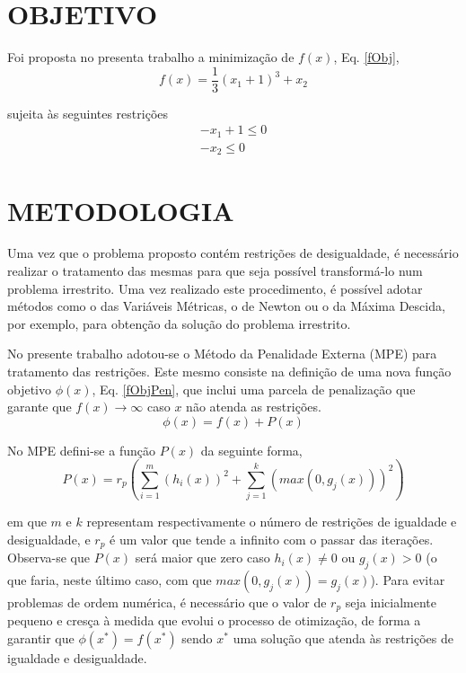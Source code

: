 \documentclass[12pt]{article}
\begin{document}
	\section{OBJETIVO}
		Foi proposta no presenta trabalho a minimização de $ f(x) $, Eq. \ref{fObj},
		\begin{equation}
			f(x) = \frac{1}{3}(x_1 + 1)^3 + x_2
			\label{fObj}
		\end{equation}
		
		sujeita às seguintes restrições
		\begin{gather}
			-x_1 + 1 \leq 0 \\
			-x_2 \leq 0
		\end{gather}
		
	\section{METODOLOGIA}
		Uma vez que o problema proposto contém restrições de desigualdade, é necessário realizar o tratamento das mesmas para que seja possível transformá-lo num problema irrestrito. Uma vez realizado este procedimento, é possível adotar métodos como o das Variáveis Métricas, o de Newton ou o da Máxima Descida, por exemplo, para obtenção da solução do problema irrestrito. 
		
		No presente trabalho adotou-se o Método da Penalidade Externa (MPE) para tratamento das restrições. Este mesmo consiste na definição de uma nova função objetivo $ \phi(x) $, Eq. \ref{fObjPen}, que inclui uma parcela de penalização que garante que $ f(x) \rightarrow \infty $ caso $ x $ não atenda as restrições. 
		\begin{equation}
			\label{fObjPen}
			\phi(x) = f(x) + P(x)
		\end{equation}
		
		No MPE defini-se a função $ P(x) $ da seguinte forma,
		\begin{equation}
			P(x) = r_p (\sum_{i = 1}^{m}(h_i(x))^2 + \sum_{j = 1}^{k} (max(0, g_j(x)))^2)
		\end{equation}		 
		
		em que $ m $ e $ k $ representam respectivamente o número de restrições de igualdade e desigualdade, e $ r_p $ é um valor que tende a infinito com o passar das iterações. Observa-se que $ P(x) $ será maior que zero caso $ h_i(x) \neq 0 $ ou $ g_j(x) > 0 $ (o que faria, neste último caso, com que $ max(0, g_j(x)) = g_j(x)$). Para evitar problemas de ordem numérica, é necessário que o valor de $ r_p $ seja inicialmente pequeno e cresça à medida que evolui o processo de otimização, de forma a garantir que $ \phi(x^*) = f(x^*) $ sendo $ x^* $ uma solução que atenda às restrições de igualdade e desigualdade.
		
\end{document}
